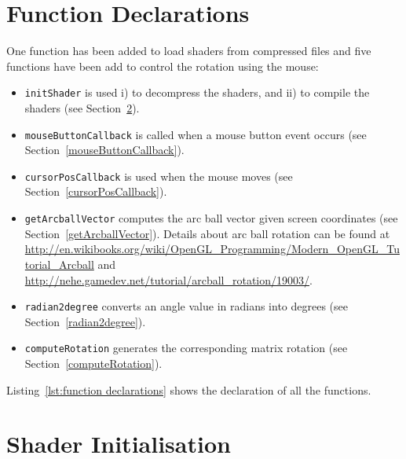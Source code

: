 \documentclass[11pt,oneside,a4paper,final]{article}
\begin{document}
\section{Function Declarations}
\label{sec:Function Declarations}

One function has been added to load shaders from compressed files and five functions have been add to control the rotation using the mouse: 
\begin{itemize}
 \item \verb+initShader+ is used i) to decompress the shaders, and ii) to compile the shaders (see Section~\ref{sec:Initialise Shaders}).

 \item \verb+mouseButtonCallback+ is called when a mouse button event occurs (see Section~\ref{mouseButtonCallback}).

 \item \verb+cursorPosCallback+ is used when the mouse moves (see Section~\ref{cursorPosCallback}).
 
  \item \verb+getArcballVector+ computes the arc ball vector given screen coordinates (see Section~\ref{getArcballVector}). 
  Details about arc ball rotation can be found at \url{http://en.wikibooks.org/wiki/OpenGL_Programming/Modern_OpenGL_Tutorial_Arcball} and \url{http://nehe.gamedev.net/tutorial/arcball_rotation/19003/}. 
 
 \item \verb+radian2degree+ converts an angle value in radians into degrees (see Section~\ref{radian2degree}).

 \item \verb+computeRotation+ generates the corresponding matrix rotation (see Section~\ref{computeRotation}).
\end{itemize}
Listing~\ref{lst:function declarations} shows the declaration of all the functions. 

\begin{center}

\end{center}


\section{Shader Initialisation}
\label{sec:Initialise Shaders}
\end{document}
